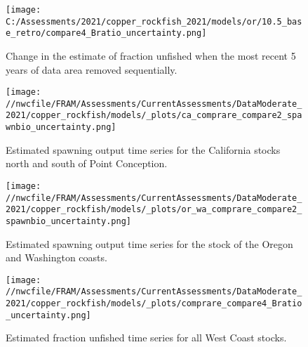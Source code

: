 \documentclass[11pt,
  english,
  a4paper,
]{article}
\begin{document}
\begin{figure}
\centering
\texttt{[image: C:/Assessments/2021/copper\_rockfish\_2021/models/or/10.5\_base\_retro/compare4\_Bratio\_uncertainty.png]}
\caption{Change in the estimate of fraction unfished when the most recent 5 years of data area removed sequentially.\label{fig:retro-depl}}
\end{figure}

\tagmcend\tagstructend

\clearpage


\begin{figure}
\centering
\texttt{[image: //nwcfile/FRAM/Assessments/CurrentAssessments/DataModerate\_2021/copper\_rockfish/models/\_plots/ca\_comprare\_compare2\_spawnbio\_uncertainty.png]}
\caption{Estimated spawning output time series for the California stocks north and south of Point Conception.\label{fig:ssb-ca-compare}}
\end{figure}

\tagmcend\tagstructend


\begin{figure}
\centering
\texttt{[image: //nwcfile/FRAM/Assessments/CurrentAssessments/DataModerate\_2021/copper\_rockfish/models/\_plots/or\_wa\_comprare\_compare2\_spawnbio\_uncertainty.png]}
\caption{Estimated spawning output time series for the stock of the Oregon and Washington coasts.\label{fig:ssb-orwa-compare}}
\end{figure}

\tagmcend\tagstructend


\begin{figure}
\centering
\texttt{[image: //nwcfile/FRAM/Assessments/CurrentAssessments/DataModerate\_2021/copper\_rockfish/models/\_plots/comprare\_compare4\_Bratio\_uncertainty.png]}
\caption{Estimated fraction unfished time series for all West Coast stocks.\label{fig:depl-compare}}
\end{figure}
\end{document}

